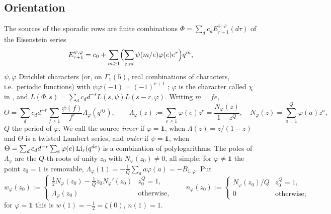 \documentclass[11pt]{amsart}
\theoremstyle{definition}
\theoremstyle{remark}
\begin{document}
\subsection{Orientation}
The sources of the sporadic rows are finite combinations $\Phi=\sum_dc_dE^{\psi,\varphi}_{r+1}(d\tau)$ of the Eisenstein series
$$E^{\psi,\varphi}_{r+1}=c_0+\sum_{m\ge1}\Bigl(\sum_{e\mid m}\psi(m/e)\varphi(e)e^r\Bigr)q^m,$$
$\psi,\varphi$ Dirichlet characters (or, on $\Gamma_1(5)$, real combinations of characters, i.e.\ periodic functions) with $\psi\varphi(-1)=(-1)^{r+1}$ \cite{DS}; $\varphi$ is the character called $\chi$ in \cite{Companions}, and $L(\Phi,s)=\sum_dc_dd^{-s}L(s,\psi)L(s-r,\varphi)$. Writing $m=fe$,
\begin{equation}\label{eq:lambert}
\Theta=\sum_dc_dd^{-r}\sum_{f\ge1}\frac{\psi(f)}{f^r}\Lambda_\varphi(q^{df}),\qquad
\Lambda_\varphi(z):=\sum_{e\ge1}\varphi(e)z^e=\frac{N_\varphi(z)}{1-z^Q},\quad N_\varphi(z)=\sum_{a=1}^Q\varphi(a)z^a,
\end{equation}
$Q$ the period of $\varphi$. We call the source \emph{inner} if $\varphi=\mathbf 1$, when $\Lambda(z)=z/(1-z)$ and $\Theta$ is a twisted Lambert series, and \emph{outer} if $\psi=\mathbf 1$, when $\Theta=\sum_dc_dd^{-r}\sum_e\varphi(e)\operatorname{Li}_r(q^{de})$ is a combination of polylogarithms. The poles of $\Lambda_\varphi$ are the $Q$-th roots of unity $z_0$ with $N_\varphi(z_0)\ne0$, all simple; for $\varphi\ne\mathbf 1$ the point $z_0=1$ is removable, $\Lambda_\varphi(1)=-\frac1Q\sum_aa\varphi(a)=-B_{1,\varphi}$. Put
$$w_\varphi(z_0):=\begin{cases}\tfrac12N_\varphi(z_0)-\tfrac1Qz_0N_\varphi'(z_0)&z_0^Q=1,\\ \Lambda_\varphi(z_0)&\text{otherwise},\end{cases}\qquad
n_\varphi(z_0):=\begin{cases}N_\varphi(z_0)/Q&z_0^Q=1,\\0&\text{otherwise};\end{cases}$$
for $\varphi=\mathbf 1$ this is $w(1)=-\tfrac12=\zeta(0)$, $n(1)=1$.
\end{document}
